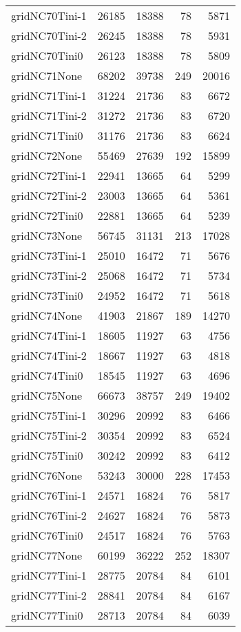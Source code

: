 \begin{longtable}{lrrrr}
gridNC70Tini-1 & 26185 & 18388 & 78 & 5871 \\
gridNC70Tini-2 & 26245 & 18388 & 78 & 5931 \\
gridNC70Tini0 & 26123 & 18388 & 78 & 5809 \\
gridNC71None & 68202 & 39738 & 249 & 20016 \\
gridNC71Tini-1 & 31224 & 21736 & 83 & 6672 \\
gridNC71Tini-2 & 31272 & 21736 & 83 & 6720 \\
gridNC71Tini0 & 31176 & 21736 & 83 & 6624 \\
gridNC72None & 55469 & 27639 & 192 & 15899 \\
gridNC72Tini-1 & 22941 & 13665 & 64 & 5299 \\
gridNC72Tini-2 & 23003 & 13665 & 64 & 5361 \\
gridNC72Tini0 & 22881 & 13665 & 64 & 5239 \\
gridNC73None & 56745 & 31131 & 213 & 17028 \\
gridNC73Tini-1 & 25010 & 16472 & 71 & 5676 \\
gridNC73Tini-2 & 25068 & 16472 & 71 & 5734 \\
gridNC73Tini0 & 24952 & 16472 & 71 & 5618 \\
gridNC74None & 41903 & 21867 & 189 & 14270 \\
gridNC74Tini-1 & 18605 & 11927 & 63 & 4756 \\
gridNC74Tini-2 & 18667 & 11927 & 63 & 4818 \\
gridNC74Tini0 & 18545 & 11927 & 63 & 4696 \\
gridNC75None & 66673 & 38757 & 249 & 19402 \\
gridNC75Tini-1 & 30296 & 20992 & 83 & 6466 \\
gridNC75Tini-2 & 30354 & 20992 & 83 & 6524 \\
gridNC75Tini0 & 30242 & 20992 & 83 & 6412 \\
gridNC76None & 53243 & 30000 & 228 & 17453 \\
gridNC76Tini-1 & 24571 & 16824 & 76 & 5817 \\
gridNC76Tini-2 & 24627 & 16824 & 76 & 5873 \\
gridNC76Tini0 & 24517 & 16824 & 76 & 5763 \\
gridNC77None & 60199 & 36222 & 252 & 18307 \\
gridNC77Tini-1 & 28775 & 20784 & 84 & 6101 \\
gridNC77Tini-2 & 28841 & 20784 & 84 & 6167 \\
gridNC77Tini0 & 28713 & 20784 & 84 & 6039 \\

\end{longtable}
